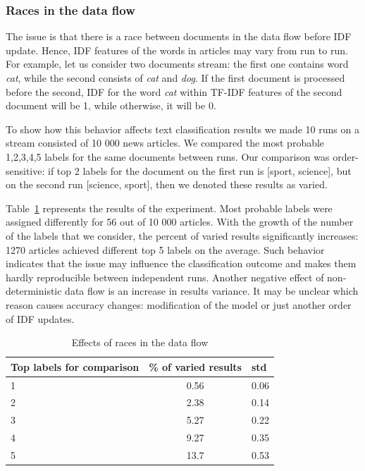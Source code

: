 \subsubsection{Races in the data flow}
The issue is that there is a race between documents in the data flow before IDF update. Hence, IDF features of the words in articles may vary from run to run. For example, let us consider two documents stream: the first one contains word {\em cat}, while the second consists of {\em cat} and {\em dog}. If the first document is processed before the second, IDF for the word {\em cat} within TF-IDF features of the second document will be 1, while otherwise, it will be 0.

To show how this behavior affects text classification results we made 10 runs on a stream consisted of 10 000 news articles. We compared the most probable 1,2,3,4,5 labels for the same documents between runs. Our comparison was order-sensitive: if top 2 labels for the document on the first run is [sport, science], but on the second run [science, sport], then we denoted these results as varied. 

Table~\ref{race_table} represents the results of the experiment. Most probable labels were assigned differently for 56 out of 10 000 articles. With the growth of the number of the labels that we consider, the percent of varied results significantly increases: 1270 articles achieved different top 5 labels on the average. Such behavior indicates that the issue may influence the classification outcome and makes them hardly reproducible between independent runs. Another negative effect of non-deterministic data flow is an increase in results variance. It may be unclear which reason causes accuracy changes: modification of the model or just another order of IDF updates.

\begin{table}[htbp]
\caption{Effects of races in the data flow}
\begin{threeparttable}
\begin{tabular}{lcl}
Top labels for comparison    & \% of varied results & std    \\
\hline
1   &   0.56    &   0.06    \\
2   &   2.38    &   0.14    \\
3   &   5.27    &   0.22    \\
4   &   9.27    &   0.35    \\
5   &   13.7    &   0.53    \\
\end{tabular}
\end{threeparttable}
\label{race_table}
\end{table}


